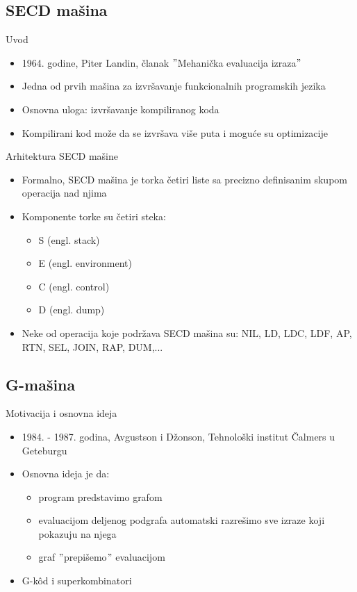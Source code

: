 \documentclass[xcolor={dvipsnames}, 11pt]{beamer}
\begin{document}
\subsection{SECD mašina}
\begin{frame}{Uvod}
	\begin{itemize}
	\item 1964. godine, Piter Landin, članak $"$Mehanička evaluacija izraza$"$
	\item Jedna od prvih mašina za izvršavanje funkcionalnih programskih jezika
	\item Osnovna uloga: izvršavanje kompiliranog koda
	\item Kompilirani kod može da se izvršava više puta i moguće su optimizacije
	\end{itemize}
\end{frame}

\begin{frame}{Arhitektura SECD mašine}
	\begin{itemize}
	\item Formalno, SECD mašina je torka četiri liste sa precizno definisanim skupom operacija nad njima
	\item Komponente torke su četiri steka: 
		\begin{itemize}
		\item S (engl. stack)
		\item E (engl. environment)
		\item C (engl. control)
		\item D	(engl. dump)
		\end{itemize}
	\item Neke od operacija koje podržava SECD mašina su: NIL, LD, LDC, LDF, AP, RTN, SEL, JOIN, RAP, DUM,...
	\end{itemize}
	
\end{frame}

\subsection{G-mašina}
\begin{frame}{Motivacija i osnovna ideja}
	\begin{itemize}
		\item 1984. - 1987. godina, Avgustson i Džonson, Tehnološki institut Čalmers u Geteburgu
		\item Osnovna ideja je da: 
			\begin{itemize}
			\item program predstavimo grafom
			\item evaluacijom deljenog podgrafa automatski razrešimo sve izraze koji pokazuju na njega
			\item graf $"$prepišemo$"$ evaluacijom
			\end{itemize}
		\item G-k\^od i superkombinatori	
	\end{itemize}
\end{frame}
\end{document}
